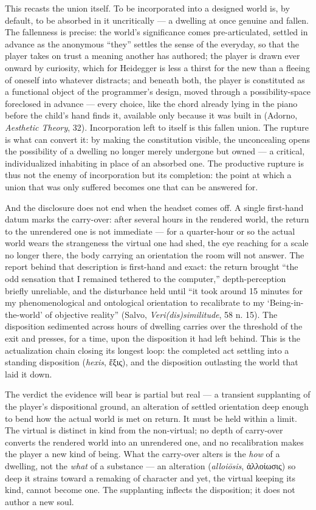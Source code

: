\documentclass{article}
\newcommand{\gk}[1]{{\greekfont #1}}
\begin{document}
This recasts the union itself. To be incorporated into a designed world is, by default, to be absorbed in it uncritically — a dwelling at once genuine and fallen. The fallenness is precise: the world's significance comes pre-articulated, settled in advance as the anonymous ``they'' settles the sense of the everyday, so that the player takes on trust a meaning another has authored; the player is drawn ever onward by curiosity, which for Heidegger is less a thirst for the new than a fleeing of oneself into whatever distracts; and beneath both, the player is constituted as a functional object of the programmer's design, moved through a possibility-space foreclosed in advance — every choice, like the chord already lying in the piano before the child's hand finds it, available only because it was built in (Adorno, \textit{Aesthetic Theory}, 32). Incorporation left to itself is this fallen union. The rupture is what can convert it: by making the constitution visible, the unconcealing opens the possibility of a dwelling no longer merely undergone but owned — a critical, individualized inhabiting in place of an absorbed one. The productive rupture is thus not the enemy of incorporation but its completion: the point at which a union that was only suffered becomes one that can be answered for.

And the disclosure does not end when the headset comes off. A single first-hand datum marks the carry-over: after several hours in the rendered world, the return to the unrendered one is not immediate — for a quarter-hour or so the actual world wears the strangeness the virtual one had shed, the eye reaching for a scale no longer there, the body carrying an orientation the room will not answer. The report behind that description is first-hand and exact: the return brought ``the odd sensation that I remained tethered to the computer,'' depth-perception briefly unreliable, and the disturbance held until ``it took around 15 minutes for my phenomenological and ontological orientation to recalibrate to my `Being-in-the-world' of objective reality'' (Salvo, \textit{Veri(dis)similitude}, 58 n. 15). The disposition sedimented across hours of dwelling carries over the threshold of the exit and presses, for a time, upon the disposition it had left behind. This is the actualization chain closing its longest loop: the completed act settling into a standing disposition (\textit{hexis}, \gk{ἕξις}), and the disposition outlasting the world that laid it down.

The verdict the evidence will bear is partial but real — a transient supplanting of the player's dispositional ground, an alteration of settled orientation deep enough to bend how the actual world is met on return. It must be held within a limit. The virtual is distinct in kind from the non-virtual; no depth of carry-over converts the rendered world into an unrendered one, and no recalibration makes the player a new kind of being. What the carry-over alters is the \textit{how} of a dwelling, not the \textit{what} of a substance — an alteration (\textit{alloiōsis}, \gk{ἀλλοίωσις}) so deep it strains toward a remaking of character and yet, the virtual keeping its kind, cannot become one. The supplanting inflects the disposition; it does not author a new soul.
\end{document}
